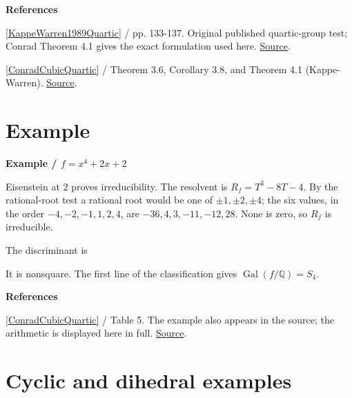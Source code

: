 \documentclass[11pt,a4paper,oneside,openany]{book}
\newcommand{\atlasdisplay}[1]{\par\begingroup\centering\vspace{3pt}\noindent\adjustbox{max width=\linewidth}{\(\displaystyle #1\)}\par\vspace{5pt}\endgroup}
\newenvironment{sources}{\par\smallskip\begingroup\footnotesize\color{atlasgray}\leftskip=10pt\setlength{\parskip}{2pt}}{\par\endgroup\smallskip}
\begin{document}
\begin{sources}
\textbf{References}\par\smallskip
\noindent\hyperlink{ref:KappeWarren1989Quartic}{[KappeWarren1989Quartic]} / pp. 133-137. Original published quartic-group test; Conrad Theorem 4.1 gives the exact formulation used here. \href{https://www.jstor.org/stable/2323198}{Source}.\par
\noindent\hyperlink{ref:ConradCubicQuartic}{[ConradCubicQuartic]} / Theorem 3.6, Corollary 3.8, and Theorem 4.1 (Kappe-Warren).  \href{https://kconrad.math.uconn.edu/blurbs/galoistheory/cubicquartic.pdf}{Source}.\par
\end{sources}\color{black}
\section{Example}

\begin{atlasblock}[standard]
\textbf{\sffamily Example  /  \(f=x^4+2x+2\)}\par\smallskip
\color{black} Eisenstein at \(2\) proves irreducibility. The resolvent is \(R_f=T^3-8T-4\). By the rational-root test a rational root would be one of \(\pm1,\pm2,\pm4\); the six values, in the order \(-4,-2,-1,1,2,4\), are \(-36,4,3,-11,-12,28\). None is zero, so \(R_f\) is irreducible.\par
\color{black} The discriminant is\par

\atlasdisplay{256\cdot2^3-27\cdot2^4=1616=16\cdot101.}
\color{black} It is nonsquare. The first line of the classification gives \(\operatorname{Gal}(f/\mathbb Q)=S_4\).\par
\end{atlasblock}\color{black}
\begin{sources}
\textbf{References}\par\smallskip
\noindent\hyperlink{ref:ConradCubicQuartic}{[ConradCubicQuartic]} / Table 5. The example also appears in the source; the arithmetic is displayed here in full. \href{https://kconrad.math.uconn.edu/blurbs/galoistheory/cubicquartic.pdf}{Source}.\par
\end{sources}\color{black}
\section{Cyclic and dihedral examples}
\end{document}
